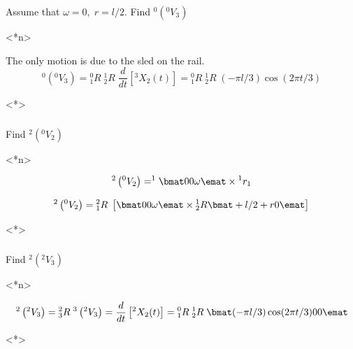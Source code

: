 \subsubsection{} \label{blah}

Assume that $\omega=0,\; r=l/2$.  Find  $^0\left(^0V_3\right)$

<*n>
\begin{solution}

The only motion is due to the sled on the rail.
\[
^0\left(^0V_3\right) =  {^0_1R}\;{^1_2R}\; \frac{d}{dt} \left[ {^3X_2}(t)\right] =  {^0_1R}\;{^1_2R}\; (-\pi l/3)\cos(2\pi t/3)
\]
\end{solution}
<*>







\subsubsection{}  \label{blahblah}

 Find $^2\left(^0V_2\right)$

<*n>
\begin{solution}
\[
^2\left(^0V_2\right) = ^1\bmat0\\0\\ \omega \emat \times {^1r_1}
\]

\[
^2\left(^0V_2\right) = {^2_1R}\;\left[ \bmat 0\\0\\ \omega \emat \times {^1_2}R\bmat+l/2 \\+r\\0 \emat \right]
\]
\end{solution}
<*>




\subsubsection{}  Find $^2\left(^2V_3\right)$

<*n>
\begin{solution}
\[
^2\left(^2V_3\right) = {^2_3R}\; ^3\left(^2V_3\right)= \frac{d}{dt} \left[ {^2X_2}(t)\right] =  {^0_1R}\;{^1_2R}\;
\bmat (-\pi l/3)\cos(2\pi t/3)\\0\\0\emat
\]
\end{solution}
<*>



